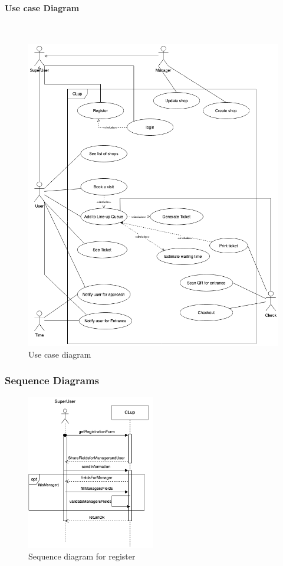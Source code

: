 \paragraph{Use case Diagram} \mbox{} \\
\begin{figure}[H]
  \includegraphics[width=\textwidth,height=\textheight,keepaspectratio]{images/Usecase.png}
  \caption{Use case diagram}
  \label{fig:usecase}
\end{figure}
\clearpage

\subsubsection{Sequence Diagrams}

\begin{figure}[H]
  \centering
  \includegraphics[width=0.5\textwidth,keepaspectratio]{images/Register_sd.png}
  \caption{Sequence diagram for register}
\end{figure}

